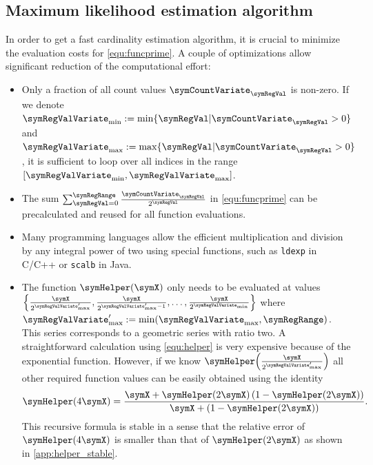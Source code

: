 \documentclass[a4paper]{scrartcl}
\begin{document}
\subsection{Maximum likelihood estimation algorithm}
In order to get a fast cardinality estimation algorithm, it is crucial to minimize the evaluation costs for \eqref{equ:funcprime}. A couple of optimizations allow significant reduction of the computational effort:
\begin{itemize}
\item Only a fraction of all count values $\symCountVariate_\symRegVal$ is non-zero. If we denote $\symRegValVariate_\text{min}:=\min\lbrace \symRegVal\vert\symCountVariate_\symRegVal>0\rbrace$ and $\symRegValVariate_\text{max}:=\max\lbrace \symRegVal\vert\symCountVariate_\symRegVal>0\rbrace$,  it is sufficient to loop over all indices in the range $[\symRegValVariate_\text{min}, \symRegValVariate_\text{max}]$.
\item The sum $\sum_{\symRegVal=0}^\symRegRange \frac{\symCountVariate_\symRegVal}{2^\symRegVal}$ in \eqref{equ:funcprime} can be precalculated and reused for all function evaluations.
\item Many programming languages allow the efficient multiplication and division by any integral power of two using special functions, such as \texttt{ldexp} in C/C++ or \texttt{scalb} in Java.
\item The function $\symHelper(\symX)$ only needs to be evaluated at values $\left\lbrace\frac{\symX}{2^{\symRegValVariate'_\text{max}}},\frac{\symX}{2^{\symRegValVariate'_\text{max}-1}},\ldots,\frac{\symX}{2^{\symRegValVariate_\text{min}}}\right\rbrace$ where $\symRegValVariate'_\text{max} := \min(\symRegValVariate_\text{max}, \symRegRange)$. This series corresponds to a geometric series with ratio two. A straightforward calculation using \eqref{equ:helper} is very expensive because of the exponential function. However, if we know $\symHelper\!\left(\frac{\symX}{2^{\symRegValVariate'_\text{max}}}\right)$ all other required function values can be easily obtained using the identity
\begin{equation}
\label{equ:helper_recursion1}
\symHelper(4\symX) = \frac{\symX+\symHelper(2\symX)\left(1-\symHelper(2\symX)\right)}{\symX+\left(1-\symHelper(2\symX)\right)}.
\end{equation}
This recursive formula is stable in a sense that the relative error of $\symHelper(4\symX)$ is smaller than that of $\symHelper(2\symX)$ as shown in \cref{app:helper_stable}.


\end{itemize}
\end{document}

